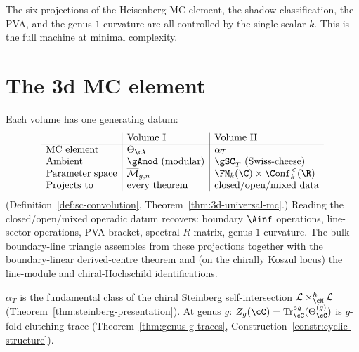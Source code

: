 The six projections of the Heisenberg MC element, the shadow
classification, the PVA, and the genus-$1$ curvature are all
controlled by the single scalar $k$. This is the full machine
at minimal complexity.

\section*{The 3d MC element}

Each volume has one generating datum:
\[
\begin{array}{l|l|l}
 & \text{Volume~I} & \text{Volume~II} \\
\hline
\text{MC element} & \Theta_\cA & \alpha_T \\
\text{Ambient} & \gAmod\ \text{(modular)} &
 \gSC_T\ \text{(Swiss-cheese)} \\
\text{Parameter space} & \Mbar_{g,n} &
 \FM_k(\C) \times \Conf_k^<(\R) \\
\text{Projects to} & \text{every theorem} &
 \text{closed/open/mixed data}
\end{array}
\]
(Definition~\ref{def:sc-convolution},
Theorem~\ref{thm:3d-universal-mc}.) Reading the
closed/open/mixed operadic datum recovers: boundary $\Ainf$
operations, line-sector operations, PVA bracket, spectral
$R$-matrix, genus-$1$ curvature. The bulk-boundary-line triangle
assembles from these projections together with the
boundary-linear derived-centre theorem and (on the chirally
Koszul locus) the line-module and chiral-Hochschild
identifications.

$\alpha_T$ is the fundamental class of the chiral Steinberg
self-intersection $\cL \times^h_{\cM} \cL$
(Theorem~\ref{thm:steinberg-presentation}). At genus $g$:
$Z_g(\cC) = \Tr_\cC^{\circ g}(\Theta_\cC^{(g)})$ is $g$-fold
clutching-trace
(Theorem~\ref{thm:genus-g-traces},
Construction~\ref{constr:cyclic-structure}).

